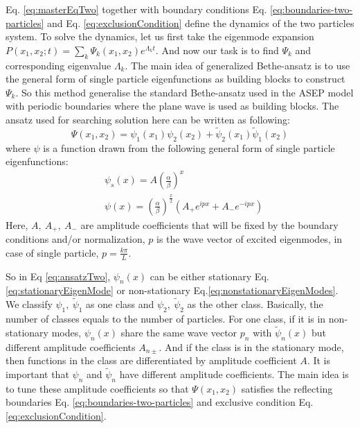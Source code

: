 \documentclass[aps,showpacs,twocolumn,floatfix,prx,superscriptaddress]{revtex4-1}
\begin{document}
Eq. \eqref{eq:masterEqTwo} together with boundary conditions Eq.  \eqref{eq:boundaries-two-particles} and Eq. \eqref{eq:exclusionCondition} define the dynamics of the two particles system. To solve the dynamics, let us first take the eigenmode expansion $P(x_1, x_2; t) = \sum_k { \Psi_k(x_1, x_2) e^{\Lambda_k t}}$. And now our task is to find $\Psi_k$ and corresponding eigenvalue $\Lambda_k$. The main idea of generalized Bethe-ansatz is to use the general form of single particle eigenfunctions as building blocks to construct $\Psi_k$. So this method generalise the standard Bethe-ansatz used in the ASEP model with periodic boundaries where the plane wave is used as building blocks. 
The ansatz used for searching solution here can be written as following:
\begin{equation}
    \label{eq:ansatzTwo}
    \Psi(x_1, x_2) = \psi_1(x_1)\psi_2(x_2) + \tilde{\psi}_2(x_1)\tilde{\psi}_1(x_2)
\end{equation}
where $\psi$ is a function drawn from the following general form of single
particle eigenfunctions:
\begin{subequations}
    \label{eq:eigenModes}
\begin{eqnarray}
    \label{eq:stationaryEigenMode}
    &\psi_s(x)  =  A\left(\frac{\alpha}{\beta}\right)^x \\
    \label{eq:nonstationaryEigenModes}
    &\psi(x)  =  \left(\frac{\alpha}{\beta}\right)^{\frac{x}{2}}
    \left(A_+ e^{ipx} +  A_-e^{-ipx}\right) 
\end{eqnarray}
\end{subequations}
Here, $A,~A_+,~A_-$ are amplitude coefficients that will be fixed by the boundary conditions and/or normalization, $p$ is the wave vector of excited eigenmodes, in case of single particle, $p=\frac{k\pi}{L}$.

So in Eq \eqref{eq:ansatzTwo}, $\psi_n(x)$ can be either stationary Eq.  \eqref{eq:stationaryEigenMode} or non-stationary Eq.\eqref{eq:nonstationaryEigenModes}. We classify $\psi_1, ~\tilde{\psi}_1$ as one class and $\psi_2,~\tilde{\psi}_2$ as the other class.  Basically, the number of classes equals to the number of particles.  For one class, if it is in non-stationary modes, $\psi_n(x)$ share the same wave vector $p_n$ with $\tilde{\psi}_n(x)$ but different amplitude coefficients $A_{n\pm}$. And if the class is in the stationary mode, then functions in the class are differentiated by amplitude coefficient $A$. It is important that $\psi_n$ and $\tilde{\psi}_n$ have different amplitude coefficients. The main idea is to tune these amplitude coefficients so that $\Psi(x_1, x_2)$ satisfies the reflecting boundaries Eq. \eqref{eq:boundaries-two-particles} and exclusive condition Eq.  \eqref{eq:exclusionCondition}.  
\end{document}
